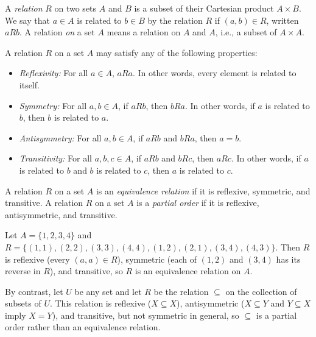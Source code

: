 \begin{definition}
A \textit{relation} $R$ on two sets $A$ and $B$ is a subset of their Cartesian product $A \times B$. We say that $a \in A$ is related to $b \in B$ by the relation $R$ if $(a, b) \in R$, written $aRb$. A relation \textit{on} a set $A$ means a relation on $A$ and $A$, i.e., a subset of $A \times A$.
\end{definition}

A relation $R$ on a set $A$ may satisfy any of the following properties:

\begin{itemize}

    \item \textit{Reflexivity:} For all $a \in A$, $aRa$. In other words, every element is related to itself.

    \item \textit{Symmetry:} For all $a, b \in A$, if $aRb$, then $bRa$. In other words, if $a$ is related to $b$, then $b$ is related to $a$.

    \item \textit{Antisymmetry:} For all $a, b \in A$, if $aRb$ and $bRa$, then $a = b$.

    \item \textit{Transitivity:} For all $a, b, c \in A$, if $aRb$ and $bRc$, then $aRc$. In other words, if $a$ is related to $b$ and $b$ is related to $c$, then $a$ is related to $c$.

\end{itemize}

\begin{definition}
A relation $R$ on a set $A$ is an \textit{equivalence relation} if it is reflexive, symmetric, and transitive. A relation $R$ on a set $A$ is a \textit{partial order} if it is reflexive, antisymmetric, and transitive.
\end{definition}

\begin{example}
Let $A = \{1, 2, 3, 4\}$ and $R = \{(1,1),(2,2),(3,3),(4,4),(1,2),(2,1),(3,4),(4,3)\}$. Then $R$ is reflexive (every $(a,a) \in R$), symmetric (each of $(1,2)$ and $(3,4)$ has its reverse in $R$), and transitive, so $R$ is an equivalence relation on $A$.

By contrast, let $U$ be any set and let $R$ be the relation $\subseteq$ on the collection of subsets of $U$. This relation is reflexive ($X \subseteq X$), antisymmetric ($X \subseteq Y$ and $Y \subseteq X$ imply $X = Y$), and transitive, but not symmetric in general, so $\subseteq$ is a partial order rather than an equivalence relation.
\end{example}

